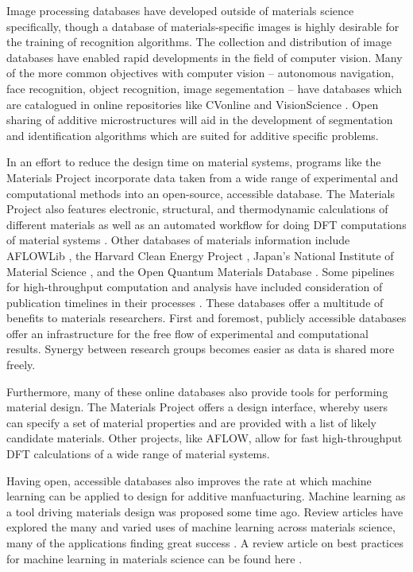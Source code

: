 Image processing databases have developed outside of materials science specifically, though a database of materials-specific images is highly desirable for the training of recognition algorithms. The collection and distribution of image databases have enabled rapid developments in the field of computer vision. Many of the more common objectives with computer vision -- autonomous navigation, face recognition, object recognition, image segementation -- have databases which are catalogued in online repositories like CVonline \cite{CVonline} and VisionScience \cite{VisionScience}. Open sharing of additive microstructures will aid in the development of segmentation and identification algorithms which are suited for additive specific problems. 

In an effort to reduce the design time on material systems, programs like the Materials Project incorporate data taken from a wide range of experimental and computational methods into an open-source, accessible database. The Materials Project also features electronic, structural, and thermodynamic calculations of different materials as well as an automated workflow for doing DFT computations of material systems \cite{Jain2011, Jain2013}. Other databases of materials information include AFLOWLib \cite{Curtarolo2012, Curtarolo2012a}, the Harvard Clean Energy Project \cite{Hachmann2011}, Japan's National Institute of Material Science \cite{NIMS}, and the Open Quantum Materials Database \cite{Saal2013}. Some pipelines for high-throughput computation and analysis have included consideration of publication timelines in their processes \cite{Foster2015}. These databases offer a multitude of benefits to materials researchers. First and foremost, publicly accessible databases offer an infrastructure for the free flow of experimental and computational results. Synergy between research groups becomes easier as data is shared more freely.

Furthermore, many of these online databases also provide tools for performing material design. The Materials Project offers a design interface, whereby users can specify a set of material properties and are provided with a list of likely candidate materials. Other projects, like AFLOW, allow for fast high-throughput DFT calculations of a wide range of material systems. 

Having open, accessible databases also improves the rate at which machine learning can be applied to design for additive manfuacturing. Machine learning as a tool driving materials design was proposed some time ago. Review articles have explored the many and varied uses of machine learning across materials science, many of the applications finding great success \cite{Kalidindi2016, Ramprasad2017, Gubernatis2018}. A review article on best practices for machine learning in materials science can be found here \cite{Wagner2016}. 

